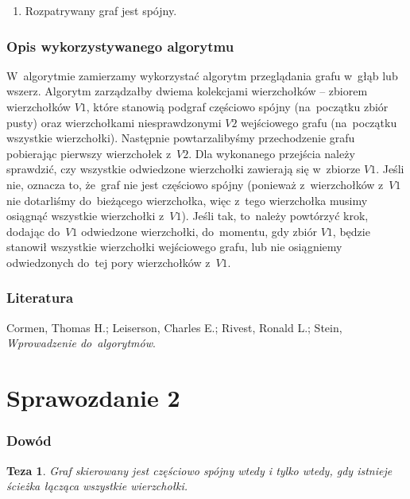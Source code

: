 \documentclass[a4paper,12pt]{mwart}
\begin{document}
\begin{enumerate}
\item Rozpatrywany graf jest spójny.
\end{enumerate}

\section{Opis wykorzystywanego algorytmu}

W~algorytmie zamierzamy wykorzystać algorytm przeglądania grafu w~głąb lub
wszerz. Algorytm zarządzałby dwiema kolekcjami wierzchołków -- zbiorem
wierzchołków $V1$, które stanowią podgraf częściowo spójny (na~początku zbiór
pusty) oraz wierzchołkami niesprawdzonymi $V2$ wejściowego grafu (na~początku
wszystkie wierzchołki). Następnie powtarzalibyśmy przechodzenie grafu
pobierając pierwszy wierzchołek z~$V2$. Dla wykonanego przejścia należy
sprawdzić, czy wszystkie odwiedzone wierzchołki zawierają się w~zbiorze $V1$.
Jeśli nie, oznacza to, że~graf nie jest częściowo spójny (ponieważ
z~wierzchołków z~$V1$ nie dotarliśmy do~bieżącego wierzchołka, więc z~tego
wierzchołka musimy osiągnąć wszystkie wierzchołki z~$V1$). Jeśli tak, to~należy
powtórzyć krok, dodając do~$V1$ odwiedzone wierzchołki, do~momentu, gdy zbiór
$V1$, będzie stanowił wszystkie wierzchołki wejściowego grafu, lub nie
osiągniemy odwiedzonych do~tej pory wierzchołków z~$V1$.

\section{Literatura}

\noindent Cormen, Thomas H.; Leiserson, Charles E.; Rivest, Ronald L.; Stein,
\emph{Wprowadzenie do~algorytmów}.

\newpage

\part{Sprawozdanie 2}

\section{Dowód}
\newtheorem{thesis}{Teza}
\begin{thesis}
Graf skierowany jest częściowo spójny wtedy i tylko wtedy,
gdy istnieje ścieżka łącząca wszystkie wierzchołki.
\end{thesis}
\end{document}
